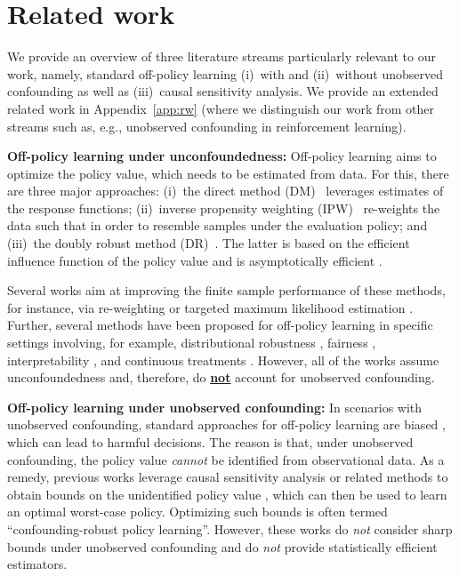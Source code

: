 \section{Related work}
\label{sec:rw}
We provide an overview of three literature streams particularly relevant to our work, namely, standard off-policy learning (i)~with and (ii)~without unobserved confounding as well as (iii)~causal sensitivity analysis. We provide an extended related work in Appendix~\ref{app:rw} (where we distinguish our work from other streams such as, e.g., unobserved confounding in reinforcement learning).

\textbf{Off-policy learning under unconfoundedness:} Off-policy learning aims to optimize the policy value, which needs to be estimated from data. For this, there are three major approaches: (i)~the direct method (DM)~\cite{Qian.2011} leverages estimates of the response functions; (ii)~inverse propensity weighting (IPW)~\cite{Swaminathan.2015} re-weights the data such that in order to resemble samples under the evaluation policy; and (iii)~the doubly robust method (DR)~\cite{Dudik.2011, Athey.2021}. The latter is based on the efficient influence function of the policy value \cite{Robins.1994b} and is asymptotically efficient \cite{vanderVaart.1998, Chernozhukov.2018}. 

Several works aim at improving the finite sample performance of these methods, for instance, via re-weighting \cite{Kallus.2018, Kallus.2021b} or targeted maximum likelihood estimation \cite{Bibaut.2019}. Further, several methods have been proposed for off-policy learning in specific settings involving, for example, distributional robustness \cite{Kallus.2022}, fairness \cite{Frauen.2024}, interpretability \cite{Tschernutter.2022}, and continuous treatments \cite{Kallus.2018d, Schweisthal.2023}. However, all of the works assume unconfoundedness and, therefore, do \textbf{\underline{not}} account for unobserved confounding.


\textbf{Off-policy learning under unobserved confounding:} In scenarios with unobserved confounding, standard approaches for off-policy learning are biased \cite{Kallus.2018c,Kallus.2021d}, which can lead to harmful decisions. The reason is that, under unobserved confounding, the policy value  \emph{cannot} be identified from observational data. As a remedy, previous works leverage causal sensitivity analysis or related methods to obtain bounds on the unidentified policy value \cite{Namkoong.2020, Bellot.2024, Guerdan.2024, Huang.2024, Joshi.2024,Zhang.2024}, which can then be used to learn an optimal worst-case policy. Optimizing such bounds is often termed ``confounding-robust policy learning''. However, these works do \emph{not} consider sharp bounds under unobserved confounding and do \emph{not} provide statistically efficient estimators.

